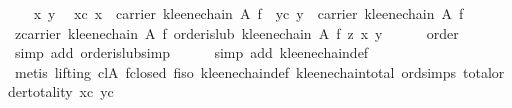 \begin{isabellebody}
\ \ \isamarkupfalse%
\ x\ y\ \isamarkupfalse%
\ xc{}\ {}x\ {}\ carrier\ {}kleene{}chain\ A\ f{}{}\ \ yc{}\ {}y\ {}\ carrier\ {}kleene{}chain\ A\ f{}{}\isanewline
\ \ \isamarkupfalse%
\ {}{}z{}carrier\ {}kleene{}chain\ A\ f{}{}\ order{}is{}lub\ {}kleene{}chain\ A\ f{}\ z\ {}x{}\ y{}{}\isanewline
\ \ \ \ \isamarkupfalse%
\ order\ \isamarkupfalse%
\ {}simp\ add{}\ order{}is{}lub{}simp{}\isanewline
\ \ \ \ \isamarkupfalse%
\ {}simp\ add{}\ kleene{}chain{}def{}\isanewline
\ \ \ \ \isamarkupfalse%
\ {}metis\ {}lifting{}\ cl{}A\ f{}closed\ f{}iso\ kleene{}chain{}def\ kleene{}chain{}total\ ord{}simps{}{}{}\ total{}order{}totality\ xc\ yc{}\isanewline

\end{isabellebody}
